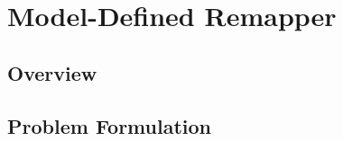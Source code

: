 \documentclass[sigconf, screen, review]{acmart}
\begin{document}
\section{Model-Defined Remapper}
\label{sec:design}

\subsection{Overview}
\label{sec:design-overview}



\subsection{Problem Formulation}
\label{sec:formulation}

\end{document}
